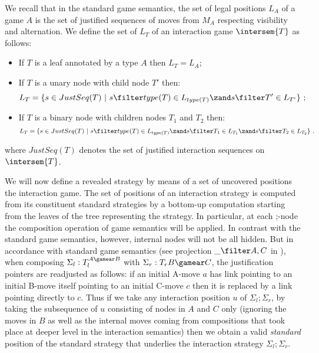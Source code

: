 \begin{definition} We recall
that in the standard game semantics, the set of legal positions
$L_A$ of a game $A$ is the set of justified sequences of moves from
$M_A$ respecting visibility and alternation. We define the set of
 $L_T$ of an interaction game $\intersem{T}$ as
follows:
    \begin{itemize}
    \item If $T$ is a leaf annotated by a type $A$ then $L_T =
    L_A$;
    \item If $T$ is a unary node with child node $T'$ then:
    $$L_T = \{ s \in JustSeq(T) \ | \ s \filter type(T) \in L_{type(T)} \zand  s \filter T' \in L_{T'} \} \ ;$$
    \item If $T$ is a binary node with children nodes $T_1$ and $T_2$ then:
    $$L_T = \{ s \in JustSeq(T) \ | \ s \filter type(T) \in L_{type(T)} \zand  s \filter T_1 \in L_{T_1}
    \zand  s \filter T_2 \in L_{T_2} \} \ .$$
    \end{itemize}
    where $JustSeq(T)$ denotes the set of justified interaction sequences on
    $\intersem{T}$.
\end{definition}


We will now define a revealed strategy by means of a set of uncovered positions the interaction game.
The set of positions of an interaction strategy is computed from its constituent standard strategies by a bottom-up computation starting from the leaves of the tree representing the strategy. In particular, at each ;-node the composition operation of game semantics will be applied. In contrast with the standard game semantics, however, internal nodes will not be all hidden. But in accordance with standard game semantics (see projection $\_ \filter A,C$ in \cite{abramsky:game-semantics-tutorial}), when composing $\Sigma_l:T_l^{A\gamear B}$ with $\Sigma_r:T_r{B\gamear C}$, the justification pointers are readjusted as follows: if an initial A-move $a$ has link pointing to an initial B-move itself pointing to an initial C-move $c$ then it is replaced by a link pointing directly to $c$. Thus if we take any interaction position $u$ of $\Sigma_l ; \Sigma_r$, by taking the subsequence of $u$ consisting of nodes in $A$ and $C$ only (ignoring the moves in $B$ as well as the internal moves coming from compositions that took place at deeper level in the interaction semantics) then we obtain a valid \emph{standard} position of the standard strategy that underlies the interaction strategy $\Sigma_l ; \Sigma_r$.

